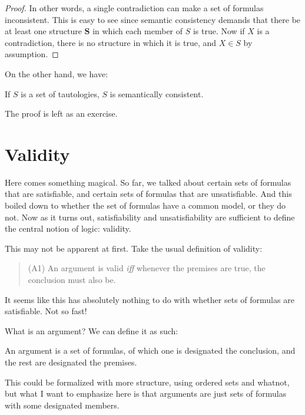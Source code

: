 \begin{proof}
In other words, a single contradiction can make a set of formulas inconsistent. This is easy to see since semantic consistency demands that there be at least one structure $\mathbf{S}$ in which each member of $S$ is true. Now if $X$ is a contradiction, there is no structure in which it is true, and $X \in S$ by assumption. 
\end{proof}

On the other hand, we have:

\begin{prop}
If $S$ is a set of tautologies, $S$ is semantically consistent. 
\end{prop}

\begin{exc}
The proof is left as an exercise. 
\end{exc}
 
\section{Validity}

Here comes something magical. So far, we talked about certain sets of formulas that are satisfiable, and certain sets of formulas that are unsatisfiable. And this boiled down to whether the set of formulas have a common model, or they do not. Now as it turns out, satisfiability and unsatisfiability are sufficient to define the central notion of logic: validity. 

This may not be apparent at first. Take the usual definition of validity:

\begin{quote}
(A1) An argument is valid \textit{iff} whenever the premises are true, the conclusion must also be. 
\end{quote}

It seems like this has absolutely nothing to do with whether sets of formulas are satisfiable. Not so fast!

What is an argument? We can define it as such:

\begin{defn}
An argument is a set of formulas, of which one is designated the conclusion, and the rest are designated the premises. 
\end{defn}

This could be formalized with more structure, using ordered sets and whatnot, but what I want to emphasize here is that arguments are just sets of formulas with some designated members. 

